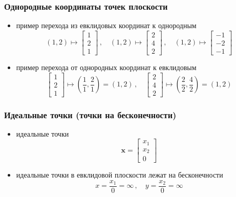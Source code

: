 \documentclass[12pt,usepdftitle=false,aspectratio=1610]{beamer}
\begin{document}
\begin{frame}
    \frametitle{Однородные координаты точек плоскости}
    \begin{itemize}
        \item пример перехода из евклидовых координат к однородным
        $$
            (1,2)\mapsto 
            \begin{bmatrix}
                1\\ 2\\ 1
            \end{bmatrix}\,,
            \quad
            (1,2)\mapsto 
            \begin{bmatrix}
                2\\ 4\\ 2
            \end{bmatrix}\,,
            \quad
            (1,2)\mapsto 
            \begin{bmatrix}
                -1\\ -2\\ -1
            \end{bmatrix}
        $$
        \item пример перехода от однородных координат к евклидовым
        $$
            \begin{bmatrix}
                1\\ 2\\ 1
            \end{bmatrix}
            \mapsto
            \left(\frac{1}{1}, \frac{2}{1}\right)=(1, 2)\,,
            \quad
            \begin{bmatrix}
                2\\ 4\\ 2
            \end{bmatrix}
            \mapsto
            \left(\frac{2}{2}, \frac{4}{2}\right)=(1, 2)
        $$
    \end{itemize}
\end{frame}

\begin{frame}
    \frametitle{Идеальные точки (точки на бесконечности)}
    \begin{itemize}
        \item идеальные точки
        $$
            \mathbf{x}=
            \begin{bmatrix}
                x_1\\ x_2\\ 0
            \end{bmatrix}
        $$
        \item идеальные точки в евклидовой плоскости лежат на бесконечности
        $$
            x=\frac{x_1}{0}=\infty\,,\quad
            y=\frac{x_2}{0}=\infty
        $$
    \end{itemize}
\end{frame}
\end{document}
